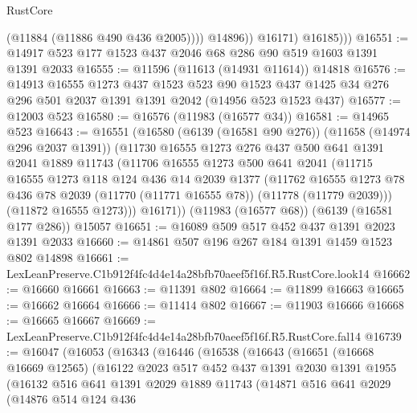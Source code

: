 \begin{lexlean}{RustCore}
\begin{coremodule}
                    (@11884 (@11886 @490 @436 @2005))))
                @14896))
            @16171)
          @16185)))
@16551 := @14917 @523 @177 @1523 @437 @2046 @68 @286 @90 @519 @1603 @1391 @1391 @2033
@16555 := @11596 (@11613 (@14931 @11614)) @14818
@16576 := @14913
    @16555
    @1273
    @437
    @1523
    @523
    @90
    @1523
    @437
    @1425
    @34
    @276
    @296
    @501
    @2037
    @1391
    @1391
    @2042
    (@14956 @523 @1523 @437)
@16577 := @12003 @523
@16580 := @16576 (@11983 (@16577 @34))
@16581 := @14965 @523
@16643 := @16551
    (@16580
      (@6139 (@16581 @90 @276))
      (@11658 (@14974 @296 @2037 @1391))
      (@11730
        @16555
        @1273
        @276
        @437
        @500
        @641
        @1391
        @2041
        @1889
        @11743
        (@11706
          @16555
          @1273
          @500
          @641
          @2041
          (@11715
            @16555
            @1273
            @118
            @124
            @436
            @14
            @2039
            @1377
            (@11762
              @16555
              @1273
              @78
              @436
              @78
              @2039
              (@11770 (@11771 @16555 @78))
              (@11778 (@11779 @2039)))
            (@11872 @16555 @1273)))
        @16171))
    (@11983 (@16577 @68))
    (@6139 (@16581 @177 @286))
    @15057
@16651 := @16089 @509 @517 @452 @437 @1391 @2023 @1391 @2033
@16660 := @14861 @507 @196 @267 @184 @1391 @1459 @1523 @802 @14898
@16661 := LexLeanPreserve.C1b912f4fc4d4e14a28bfb70aeef5f16f.R5.RustCore.look14
@16662 := @16660 @16661
@16663 := @11391 @802
@16664 := @11899 @16663
@16665 := @16662 @16664
@16666 := @11414 @802
@16667 := @11903 @16666
@16668 := @16665 @16667
@16669 := LexLeanPreserve.C1b912f4fc4d4e14a28bfb70aeef5f16f.R5.RustCore.fal14
@16739 := @16047
    (@16053
      (@16343
        (@16446
          (@16538
            (@16643
              (@16651
                (@16668 @16669 @12565)
                (@16122
                  @2023
                  @517
                  @452
                  @437
                  @1391
                  @2030
                  @1391
                  @1955
                  (@16132
                    @516
                    @641
                    @1391
                    @2029
                    @1889
                    @11743
                    (@14871
                      @516
                      @641
                      @2029
                      (@14876
                        @514
                        @124
                        @436

\end{coremodule}
\end{lexlean}

